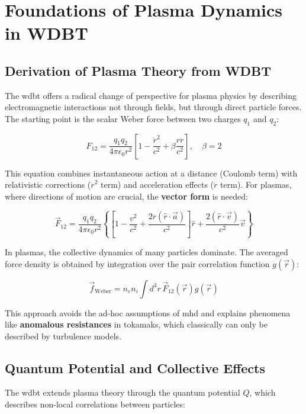 \chapter{Foundations of Plasma Dynamics in WDBT}
\label{ch:grundlagen}
\section{Derivation of Plasma Theory from WDBT}
The \gls{wdbt} offers a radical change of perspective for plasma physics by describing electromagnetic interactions not through fields, but through direct particle forces. The starting point is the scalar Weber force between two charges $q_1$ and $q_2$:

\begin{equation}
    \label{eq:weber_em_skalar}
    F_{12} = \frac{q_1 q_2}{4\pi \epsilon_0 r^2} \left[ 1 - \frac{\dot{r}^2}{c^2} + \beta \frac{r \ddot{r}}{c^2} \right],\quad \beta = 2
\end{equation}

This equation combines instantaneous action at a distance (Coulomb term) with relativistic corrections ($\dot{r}^2$ term) and acceleration effects ($\ddot{r}$ term). For plasmas, where directions of motion are crucial, the \textbf{vector form} is needed:

\begin{equation}
    \label{eq:weber_em_vektor}
    \vec{F}_{12} = \frac{q_1 q_2}{4\pi \epsilon_0 r^2} \left\{ \left[ 1 - \frac{v^2}{c^2} + \frac{2 r (\hat{r} \cdot \vec{a})}{c^2} \right] \hat{r} + \frac{2 (\hat{r} \cdot \vec{v})}{c^2} \vec{v} \right\}
\end{equation}

In plasmas, the collective dynamics of many particles dominate. The averaged force density is obtained by integration over the pair correlation function $g(\vec{r})$:

\begin{equation}
    \label{eq:weber_kraftdichte}
    \vec{f}_{\text{Weber}} = n_e n_i \int d^3r \, \vec{F}_{12}(\vec{r}) g(\vec{r})
\end{equation}

This approach avoids the ad-hoc assumptions of \gls{mhd} and explains phenomena like \textbf{anomalous resistances} in tokamaks, which classically can only be described by turbulence models.

\section{Quantum Potential and Collective Effects}
The \gls{wdbt} extends plasma theory through the quantum potential $Q$, which describes non-local correlations between particles:

